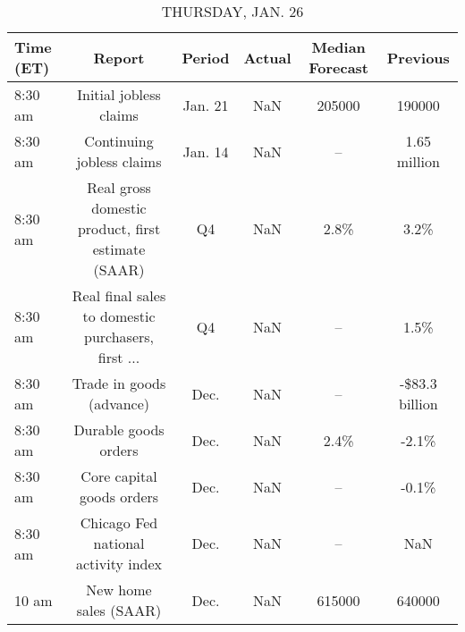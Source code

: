 \documentclass{article}%
\begin{document}
\begin{table}[htbp]%
\caption{THURSDAY, JAN. 26}%
\centering%
\begin{adjustbox}{width=1\textwidth}%
\begin{tabular}{lccccc}
\toprule
Time (ET) &                                             Report &  Period & Actual & Median Forecast &       Previous \\
\midrule
  8:30 am &                             Initial jobless claims & Jan. 21 &    NaN &          205000 &         190000 \\
  8:30 am &                          Continuing jobless claims & Jan. 14 &    NaN &              -- &   1.65 million \\
  8:30 am & Real gross domestic product, first estimate (SAAR) &      Q4 &    NaN &            2.8\% &           3.2\% \\
  8:30 am & Real final sales to domestic purchasers, first ... &      Q4 &    NaN &              -- &           1.5\% \\
  8:30 am &                           Trade in goods (advance) &    Dec. &    NaN &              -- & -\$83.3 billion \\
  8:30 am &                               Durable goods orders &    Dec. &    NaN &            2.4\% &          -2.1\% \\
  8:30 am &                          Core capital goods orders &    Dec. &    NaN &              -- &          -0.1\% \\
  8:30 am &                Chicago Fed national activity index &    Dec. &    NaN &              -- &            NaN \\
    10 am &                              New home sales (SAAR) &    Dec. &    NaN &          615000 &         640000 \\
\bottomrule
\end{tabular}
%
\end{adjustbox}%
\end{table}

%
\end{document}
